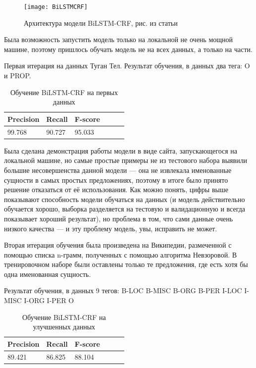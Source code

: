 \begin{figure}[H]
\caption{Архитектура модели BiLSTM-CRF, рис. из статьи \cite{ju-etal-2018-neural}}
\texttt{[image: BiLSTMCRF]}
\label{fig:BiLSTMCRF}
\end{figure}


Была возможность запустить модель только на локальной не очень мощной машине, поэтому пришлось обучать модель не на всех данных, а только на части.

Первая итерация на данных Туган Тел. Результат обучения, в данных два тега: O и PROP.

\vspace{1cm}

\begin{table}[h]
\begin{tabular}{ | l | l | l | l | l | l |}
\hline
Precision  &   Recall   &  F-score   \\

\hline
99.768     & 90.727     & 95.033      \\
\hline
\end{tabular}
\caption{Обучение BiLSTM-CRF на первых данных}
\end{table}

\vspace{1cm}

Была сделана демонстрация работы модели в виде сайта, запускающегося на локальной машине, но самые простые примеры не из тестового набора выявили большие несовершенства данной модели --- она не извлекала именованные сущности в самых простых предложениях, поэтому в итоге было принято решение отказаться от её использования. %
Как можно понять, цифры выше показывают способность модели обучаться на данных (и модель действительно обучается хорошо, выборка разделяется на тестовую и валидационную и всегда показывает хороший результат), но проблема в том, что сами данные очень низкого качества --- и эту проблему модель, увы, исправить не может.

Вторая итерация обучения была произведена на Википедии, размеченной с помощью списка n-грамм, полученных с помощью алгоритма Невзоровой. В тренировочном наборе были оставлены только те предложения, где есть хотя бы одна именованная сущность.

Результат обучения, в данных 9 тегов:
B-LOC
B-MISC
B-ORG
B-PER
I-LOC
I-MISC
I-ORG
I-PER
O
\vspace{1cm}

\begin{table}[h]
\begin{tabular}{| l | l | l | l | l | l |}
\hline
Precision  &   Recall   &  F-score   \\

\hline
                89.421     & 86.825     & 88.104          \\
\hline
\end{tabular}
\caption{Обучение BiLSTM-CRF на улучшенных данных}
\end{table}
\vspace{1cm}

